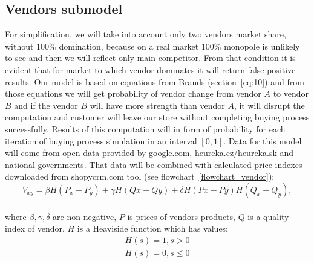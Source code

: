 \subsection{Vendors submodel} \label{subsec:model_vendors}
For simplification, we will take into account only two vendors market share, without 100\% domination, because on a real
market 100\% monopole is unlikely to see and then we will reflect only main competitor.
From that condition it is evident that for market to which vendor dominates it will return false positive results.
Our model is based on equations from Brands (section~\ref{eq:10}) and from those equations we will get probability of vendor
change from vendor $A$ to vendor $B$ and if the vendor $B$ will have more strength than vendor $A$, it will disrupt the
computation and customer will leave our store without completing buying process successfully.
Results of this computation will in form of probability for each iteration of buying process simulation in an interval $[0,1]$.
Data for this model will come from open data provided by google.com, heureka.cz/heureka.sk and national governments.
That data will be combined with calculated price indexes downloaded from shopycrm.com tool (see flowchart~\ref{flowchart_vendor}):
\\
\begin{equation} \label{eq:13}
V_{xy} = \beta H(P_x-P_y) + \gamma H(Qx-Qy) + \delta H(Px-Py)H(Q_x - Q_y),
\end{equation}
\\
where $\beta, \gamma, \delta$ are non-negative, $P$ is prices of vendors products, $Q$ is a quality index of vendor, $H$ is a Heaviside function which has values:\\
\begin{equation} \label{eq:14}
\begin{array}{l}
    H(s) = 1, s > 0 \\
    H (s) = 0, s \leq 0
\end{array}
\end{equation}
\\
